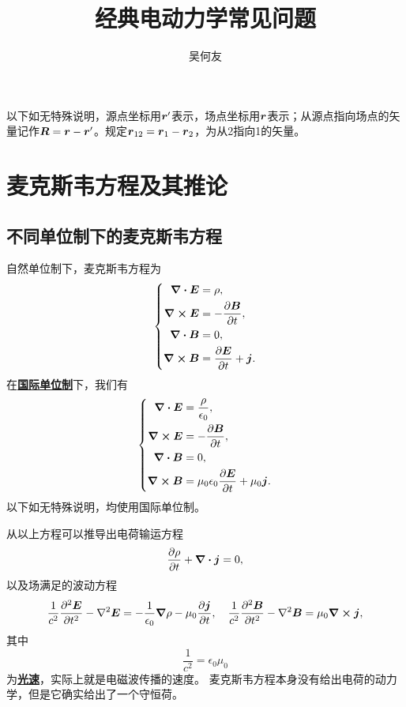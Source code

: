 \documentclass[UTF8, a4paper]{ctexart}
\title{经典电动力学常见问题}
\author{吴何友}
\newcommand*{\concept}[1]{\underline{\textbf{#1}}}
\begin{document}
\maketitle

以下如无特殊说明，源点坐标用$\vb*{r}'$表示，场点坐标用$\vb*{r}$表示；从源点指向场点的矢量记作$\vb*{R} = \vb*{r} - \vb*{r}'$。规定$\vb*{r}_{12} = \vb*{r}_1 - \vb*{r}_2$，为从2指向1的矢量。

\section{麦克斯韦方程及其推论}

\subsection{不同单位制下的麦克斯韦方程}

自然单位制下，麦克斯韦方程为
\begin{equation}
    \left\{
        \begin{aligned}
            \div{\vb*{E}} &= \rho, \\
            \curl{\vb*{E}} &= - \pdv{\vb*{B}}{t}, \\
            \div{\vb*{B}} &= 0, \\
            \curl{\vb*{B}} &= \pdv{\vb*{E}}{t} + \vb*{j}.
        \end{aligned}
    \right.
    \label{eq:maxwell-eq}
\end{equation}
在\concept{国际单位制}下，我们有
\begin{equation}
    \left\{
        \begin{aligned}
            \div{\vb*{E}} &= \frac{\rho}{\epsilon_0}, \\
            \curl{\vb*{E}} &= - \pdv{\vb*{B}}{t}, \\
            \div{\vb*{B}} &= 0, \\
            \curl{\vb*{B}} &= \mu_0 \epsilon_0 \pdv{\vb*{E}}{t} + \mu_0 \vb*{j}.
        \end{aligned}
    \right.
    \label{eq:maxwell-eq-si}
\end{equation}
以下如无特殊说明，均使用国际单位制。

从以上方程可以推导出电荷输运方程
\begin{equation}
    \pdv{\rho}{t} + \div{\vb*{j}} = 0,
    \label{eq:charge-transportation}
\end{equation}
以及场满足的波动方程
\begin{equation}
    \frac{1}{c^2} \pdv[2]{\vb*{E}}{t} - \laplacian{\vb*{E}} = - \frac{1}{\epsilon_0} \grad{\rho} - \mu_0 \pdv{\vb*{j}}{t} , \quad \frac{1}{c^2} \pdv[2]{\vb*{B}}{t} - \laplacian{\vb*{B}} = \mu_0 \curl{\vb*{j}},
    \label{eq:wave-eq-general}
\end{equation}
其中
\begin{equation}
    \frac{1}{c^2} = \epsilon_0 \mu_0
\end{equation}
为\concept{光速}，实际上就是电磁波传播的速度。
麦克斯韦方程本身没有给出电荷的动力学，但是它确实给出了一个守恒荷。
\end{document}
